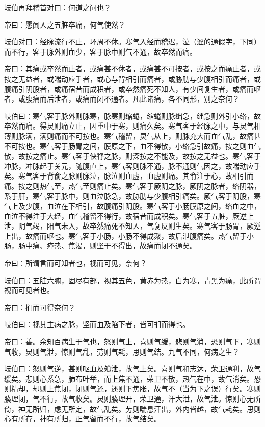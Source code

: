 \documentclass{article}%
\begin{document}
岐伯再拜稽首对曰：何道之问也？

帝曰：愿闻人之五脏卒痛，何气使然？

岐伯对曰：经脉流行不止，环周不休。寒气入经而稽迟，泣（涩的通假字，下同）而不行，客于脉外则血少，客于脉中则气不通，故卒然而痛。

帝曰：其痛或卒然而止者，或痛甚不休者，或痛甚不可按者，或按之而痛止者，或按之无益者，或喘动应手者，或心与背相引而痛者，或胁肋与少腹相引而痛者，或腹痛引阴股者，或痛宿昔而成积者，或卒然痛死不知人，有少间复生者，或痛而呕者，或腹痛而后泄者，或痛而闭不通者。凡此诸痛，各不同形，别之奈何？

岐伯曰：寒气客于脉外则脉寒，脉寒则缩蜷，缩蜷则脉绌急，绌急则外引小络，故卒然而痛。得炅则痛立止，因重中于寒，则痛久矣。寒气客于经脉之中，与炅气相薄则脉满，满则痛而不可按也。寒气稽留，炅气从上，则脉充大而血气乱，故痛甚不可按也。寒气客于肠胃之间，膜原之下，血不得散，小络急引故痛，按之则血气散，故按之痛止。寒气客于侠脊之脉，则深按之不能及，故按之无益也。寒气客于冲脉，冲脉起于关元，随腹直上，寒气客则脉不通，脉不通则气因之，故喘动应手矣。寒气客于背俞之脉则脉泣，脉泣则血虚，血虚则痛。其俞注于心，故相引而痛。按之则热气至，热气至则痛止矣。寒气客于厥阴之脉，厥阴之脉者，络阴器，系于肝，寒气客于脉中，则血泣脉急，故胁肋与少腹相引痛矣。厥气客于阴股，寒气上及少腹，血泣在下相引，故腹痛引阴股。寒气客于小肠膜原之间，络血之中，血泣不得注于大经，血气稽留不得行，故宿昔而成积矣。寒气客于五脏，厥逆上泄，阴气竭，阳气未入，故卒然痛死不知人，气复反则生矣。寒气客于肠胃，厥逆上出，故痛而呕也。寒气客于小肠，小肠不得成聚，故后泄腹痛矣。热气留于小肠，肠中痛、瘅热、焦渴，则坚干不得出，故痛而闭不通矣。

帝曰：所谓言而可知者也，视而可见，奈何？

岐伯曰：五脏六腑，固尽有部，视其五色，黄赤为热，白为寒，青黑为痛，此所谓视而可见者也。

帝曰：扪而可得奈何？

岐伯曰：视其主病之脉，坚而血及陷下者，皆可扪而得也。

帝曰：善。余知百病生于气也，怒则气上，喜则气缓，悲则气消，恐则气下，寒则气收，炅则气泄，惊则气乱，劳则气耗，思则气结。九气不同，何病之生？

岐伯曰：怒则气逆，甚则呕血及飧泄，故气上矣。喜则气和志达，荣卫通利，故气缓矣。悲则心系急，肺布叶举，而上焦不通，荣卫不散，热气在中，故气消矣。恐则精却，却则上焦闭，闭则气还，还则下焦胀，故气不（当为下之误）行矣。寒则腠理闭，气不行，故气收矣。炅则腠理开，荣卫通，汗大泄，故气泄。惊则心无所倚，神无所归，虑无所定，故气乱矣。劳则喘息汗出，外内皆越，故气耗矣。思则心有所存，神有所归，正气留而不行，故气结矣。
\end{document}
